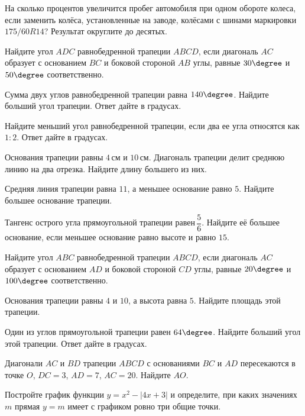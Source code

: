 \begin{class}[number=3]
\begin{listofex}
		\item На сколько процентов увеличится пробег автомобиля при одном обороте колеса, если заменить колёса, установленные на заводе, колёсами с шинами маркировки \( 175/60 R14 \)? Результат округлите до десятых.
		\item Найдите угол \( ADC \) равнобедренной трапеции \( ABCD \), если диагональ \( AC \) образует с основанием \( BC \) и боковой стороной \( AB \) углы, равные \( 30\degree \) и \( 50\degree \) соответственно.
		\item Сумма двух углов равнобедренной трапеции равна \( 140\degree \). Найдите больший угол трапеции. Ответ дайте в градусах.
		\item Найдите меньший угол равнобедренной трапеции, если два ее угла относятся как \( 1:2 \). Ответ дайте в градусах.
		\item Основания трапеции равны \( 4 \) см и \( 10 \) см. Диагональ трапеции делит среднюю линию на два отрезка. Найдите длину большего из них.
		\item Средняя линия трапеции равна \( 11 \), а меньшее основание равно \( 5 \). Найдите большее основание трапеции.
		\item Тангенс острого угла прямоугольной трапеции равен \( \dfrac{5}{6} \).  Найдите её большее основание, если меньшее основание равно высоте и равно \( 15 \).
		\item Найдите угол \( ABC \) равнобедренной трапеции \( ABCD \), если диагональ \( AC \) образует с основанием \( AD \) и боковой стороной \( CD \) углы, равные \( 20\degree \) и \( 100\degree \) соответственно.
		\item Основания трапеции равны \( 4 \) и \( 10 \), а высота равна \( 5 \). Найдите площадь этой трапеции.
		\item Один из углов прямоугольной трапеции равен \( 64\degree \). Найдите больший угол этой трапеции. Ответ дайте в градусах.
		\item Диагонали \( AC \) и \( BD \) трапеции \( ABCD \) с основаниями \( BC \) и \( AD \) пересекаются в точке \( O \), \( DC=3 \), \( AD=7 \), \( AC=20 \). Найдите \( AO \).
		\item Постройте график функции \( y=x^2-|4x+3| \) и определите, при каких значениях \( m \) прямая \( y=m \) имеет с графиком ровно три общие точки.
	\end{listofex}
\end{class}

